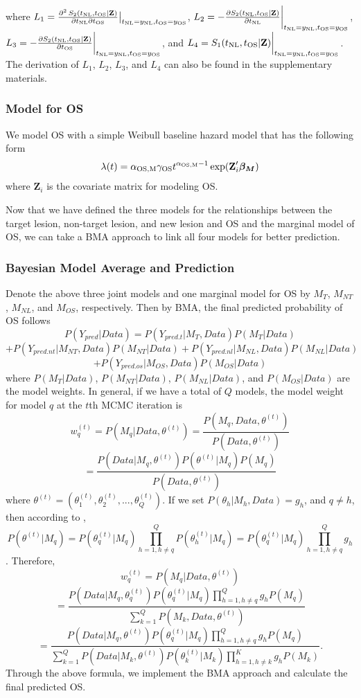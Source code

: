 where $L_1=\frac{\partial^2\, S_2(t_{\rm NL}, t_{\rm OS}|\textbf{Z})}{\partial t_{\rm NL} \partial t_{\rm OS}}\big|_{t_{\rm NL}=y_{\rm NL},t_{\rm OS}=y_{\rm OS}}$, $L_2=-\frac{\partial S_2(t_{\rm NL}, t_{\rm OS}|\textbf{Z})}{\partial t_{\rm NL}}\bigg|_{t_{\rm NL}=y_{\rm NL},t_{\rm OS}=y_{\rm OS}}$, $L_3=-\frac{\partial S_2(t_{\rm NL}, t_{\rm OS}|\textbf{Z})}{\partial t_{\rm OS}}\bigg|_{t_{\rm NL}=y_{\rm NL},t_{\rm OS}=y_{\rm OS}}$, and $L_4=S_1(t_{\rm NL}, t_{\rm OS}|\textbf{Z})\bigg|_{t_{\rm NL}=y_{\rm NL},t_{\rm OS}=y_{\rm OS}}$.
The derivation of $L_1$, $L_2$, $L_3$, and $L_4$ can also be found in the supplementary materials.

\subsubsection{Model for OS}
We model \ac{OS} with a simple Weibull baseline hazard model that has the following form
$$\lambda(t)=\alpha_{\rm OS,M} \gamma_{\rm OS} t^{\alpha_{\rm OS,M}-1} \exp(\textbf{Z}_i' \boldsymbol{\beta_{M}})$$
where $\textbf{Z}_i$ is the covariate matrix for modeling \ac{OS}.

Now that we have defined the three models for the relationships between the target lesion, non-target lesion, and new lesion and \ac{OS} and the marginal model of \ac{OS}, we can take a \ac{BMA} approach to link all four models
for better prediction.

\subsubsection{Bayesian Model Average and Prediction}

Denote the above three joint models and one marginal model for \ac{OS} by $M_T$, $M_{NT}$, $M_{NL}$, and $M_{OS}$, respectively. Then by \ac{BMA}, the final predicted probability of \ac{OS} follows
$$P(Y_{pred}|Data)=P(Y_{pred.t}|M_T,Data)P(M_T|Data)$$
$$+P(Y_{pred.nt}|M_{NT},Data)P(M_{NT}|Data)+P(Y_{pred.nl}|M_{NL},Data)P(M_{NL}|Data)$$
$$+P(Y_{pred.os}|M_{OS},Data)P(M_{OS}|Data)$$
where $P(M_T|Data)$, $P(M_{NT}|Data)$, $P(M_{NL}|Data)$, and $P(M_{OS}|Data)$ are the model weights. In general, if we have a total of $Q$ models, the model weight for model $q$ at the $t$th MCMC iteration is  
$$w^{(t)}_q=P(M_q|Data,\theta^{(t)})=\frac{P(M_q,Data,\theta^{(t)})}{P(Data,\theta^{(t)})}$$
$$=\frac{P(Data|M_q,\theta^{(t)})P(\theta^{(t)}|M_q)P(M_q)}{P(Data,\theta^{(t)})}$$
where $\theta^{(t)} = (\theta_1^{(t)}, \theta_2^{(t)},...,\theta_Q^{(t)})$. If we set $P(\theta_h|M_h, Data)=g_h$, and $q \ne h$, then according to \cite{congdon2007model},
$$P(\theta^{(t)}|M_q)=P(\theta_q^{(t)}|M_q) \prod_{h=1,h\ne q}^Q P(\theta_h^{(t)}|M_q)=P(\theta_q^{(t)}|M_q) \prod_{h=1,h\ne q}^Q g_h$$.
Therefore, 
$$w^{(t)}_q=P(M_q|Data,\theta^{(t)})$$
$$
=\frac{P(Data|M_q,\theta^{(t)}_q) P(\theta^{(t)}_q|M_q) \prod_{h=1,h\ne q}^Q g_h P(M_q)}{\sum_{k=1}^Q P(M_k,Data, \theta^{(t)})} 
$$
$$=\frac{P(Data|M_q,\theta^{(t)}) P(\theta_q^{(t)}|M_q) \prod_{h=1,h\ne q}^Q g_h P(M_q) }{\sum_{k=1}^Q P(Data|M_k,\theta^{(t)}) P(\theta_k^{(t)}|M_k) \prod_{h=1,h\ne k}^K g_h P(M_k)}.
$$
Through the above formula, we implement the \ac{BMA} approach and calculate the final predicted \ac{OS}. 

